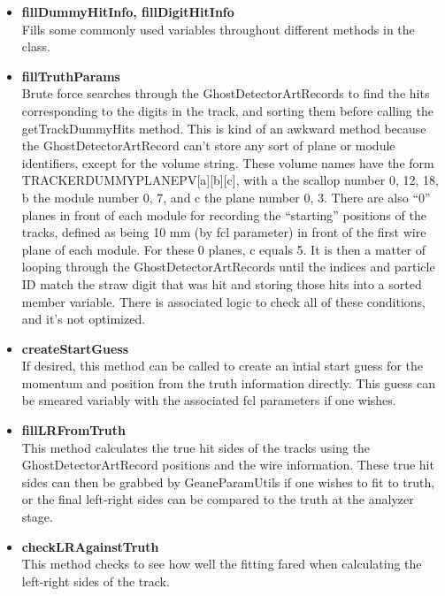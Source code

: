 \begin{enumerate}
\begin{itemize}
          \item{\bf{fillDummyHitInfo, fillDigitHitInfo}} \\
          Fills some commonly used variables throughout different methods in the class.

          \item{\bf{fillTruthParams}} \\
          Brute force searches through the GhostDetectorArtRecords to find the hits corresponding to the digits in the track, and sorting them before calling the getTrackDummyHits method. This is kind of an awkward method because the GhostDetectorArtRecord can't store any sort of plane or module identifiers, except for the volume string. These volume names have the form TRACKERDUMMYPLANEPV[a][b][c], with a the scallop number {0, 12, 18}, b the module number {0, 7}, and c the plane number {0, 3}. There are also ``0'' planes in front of each module for recording the ``starting'' positions of the tracks, defined as being 10 mm (by fcl parameter) in front of the first wire plane of each module. For these 0 planes, c equals 5. It is then a matter of looping through the GhostDetectorArtRecords until the indices and particle ID match the straw digit that was hit and storing those hits into a sorted member variable. There is associated logic to check all of these conditions, and it's not optimized.

          \item{\bf{createStartGuess}} \\
          If desired, this method can be called to create an intial start guess for the momentum and position from the truth information directly. This guess can be smeared variably with the associated fcl parameters if one wishes.

          \item{\bf{fillLRFromTruth}} \\
          This method calculates the true hit sides of the tracks using the GhostDetectorArtRecord positions and the wire information. These true hit sides can then be grabbed by GeaneParamUtils if one wishes to fit to truth, or the final left-right sides can be compared to the truth at the analyzer stage.

          \item{\bf{checkLRAgainstTruth}} \\
          This method checks to see how well the fitting fared when calculating the left-right sides of the track.


        \end{itemize}


\end{enumerate}
